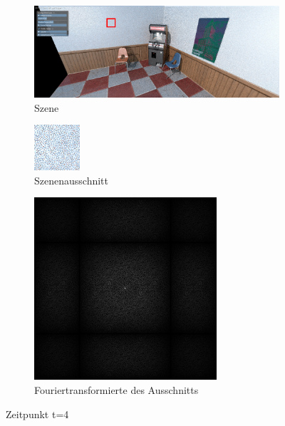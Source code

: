 \begin{figure}[H]
    \begin{subfigure}{\textwidth}  
        \centering \includegraphics[scale=.2]{content/TemporalerAlg/Bilder/Screenshotreihe/frame_t_4.0.png}
        \caption{Szene}
        \label{fig:Szene_t4}
    \end{subfigure}
    \begin{subfigure}{0.5\textwidth}
        \centering\includegraphics[width=0.5\linewidth]{content/TemporalerAlg/Bilder/Screenshotreihe/frame_t_4.0_64x64.png} 
        \caption{Szenenausschnitt}
        \label{fig:ausschnitt_t4}
    \end{subfigure}
    \begin{subfigure}{0.5\textwidth}
        \centering\includegraphics[width=0.5\linewidth]{content/TemporalerAlg/Bilder/Screenshotreihe/spektrum/frame_t_4.0_64x64_fourier.png}
        \caption{Fouriertransformierte des Ausschnitts}
        \label{fig:Fouriertransformierte_t4}
    \end{subfigure}
        \caption{Zeitpunkt t=4}
        \label{fig:Verlauf_t4}
\end{figure}

